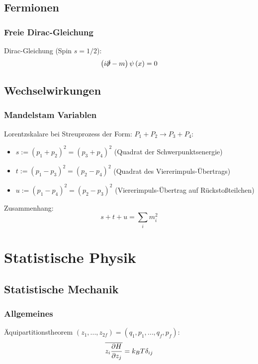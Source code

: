 \documentclass[11pt]{article}
\numberwithin{equation}{section}
\begin{document}
    \subsection{Fermionen}
      \subsubsection{Freie Dirac-Gleichung}
        Dirac-Gleichung (Spin $s=1/2$):
        \begin{equation}
          \left(  i\slashed{\partial} - m  \right) \psi\left( x \right) = 0
        \end{equation}





    \subsection{Wechselwirkungen}
      \subsubsection{Mandelstam Variablen}
        Lorentzskalare bei Streuprozess der Form: $P_1 + P_2 \rightarrow P_3 + P_4$:
        \begin{itemize}\itemsep -0pt  %
          \item $s:=(p_1+p_2)^2=(p_3+p_4)^2$ \hfill{(Quadrat der Schwerpunktsenergie)}
          \item $t:=(p_1-p_3)^2=(p_2-p_4)^2$ \hfill{(Quadrat des Viererimpuls-Übertrags)}
          \item $u:=(p_1-p_4)^2=(p_2-p_3)^2$ \hfill{(Viererimpuls-Übertrag auf Rückstoßteilchen)}
        \end{itemize}

        Zusammenhang:
        \begin{equation}
          s+t+u = \sum_i m_i^2
        \end{equation}




  \newpage
  \section{Statistische Physik}
      \subsection{Statistische Mechanik}
        \subsubsection{Allgemeines}
          Äquipartitionstheorem $(z_1,...,z_{2f}) = (q_1, p_1, ..., q_f, p_f)$:
          \begin{equation}
            \overline{ z_i \frac{\partial H}{\partial z_j}} = k_B T \delta_{ij}
          \end{equation}
\end{document}
